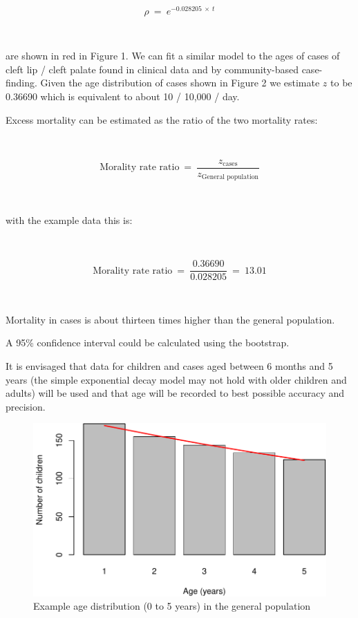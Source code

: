 \documentclass[12pt,a4paper]{article}
\begin{document}
~

\begin{equation}
\rho ~ = ~ e ^ {-0.028205 ~ \times ~ t}
\end{equation}

~

are shown in red in Figure 1. We can fit a similar model to the ages of
cases of cleft lip / cleft palate found in clinical data and by
community-based case-finding. Given the age distribution of cases shown
in Figure 2 we estimate \(z\) to be 0.36690 which is equivalent to about
10 / 10,000 / day.

Excess mortality can be estimated as the ratio of the two mortality
rates:

~

\begin{equation}
\text{Morality rate ratio} ~ = ~ \frac{z_\text{cases}}{z_\text{General population}}
\end{equation}

~

with the example data this is:

~

\begin{equation}
\text{Morality rate ratio} ~ = ~ \frac{0.36690}{0.028205} ~ = ~ 13.01
\end{equation}

~

Mortality in cases is about thirteen times higher than the general
population.

A 95\% confidence interval could be calculated using the bootstrap.

It is envisaged that data for children and cases aged between 6 months
and 5 years (the simple exponential decay model may not hold with older
children and adults) will be used and that age will be recorded to best
possible accuracy and precision.

\newpage

\begin{figure}

{\centering \includegraphics{figures/figure1-1} 

}

\caption{Example age distribution (0 to 5 years) in the general population}\label{fig:figure1}
\end{figure}
\end{document}
